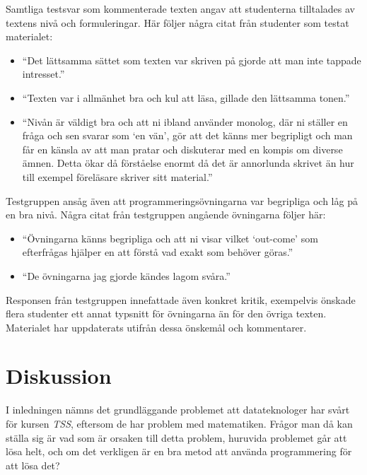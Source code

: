 \documentclass[12pt,a4paper,twoside,openright]{article}
\begin{document}
Samtliga testsvar som kommenterade texten angav att studenterna
tilltalades av textens nivå och formuleringar. Här följer några citat
från studenter som testat materialet:
\begin{itemize}
\item ``Det lättsamma sättet som texten var skriven på gjorde att man
 inte tappade intresset.''
\item ``Texten var i allmänhet bra och kul att läsa, gillade den
 lättsamma tonen.''
\item ``Nivån är väldigt bra och att ni ibland använder monolog, där
 ni ställer en fråga och sen svarar som `en vän', gör att det känns
 mer begripligt och man får en känsla av att man pratar och
 diskuterar med en kompis om diverse ämnen. Detta ökar då förståelse
 enormt då det är annorlunda skrivet än hur till exempel föreläsare
 skriver sitt material.''
\end{itemize}

Testgruppen ansåg även att programmeringsövningarna var begripliga och
låg på en bra nivå. Några citat från testgruppen angående övningarna
följer här:
\begin{itemize}
\item ``Övningarna känns begripliga och att ni visar vilket `out-come'
 som efterfrågas hjälper en att förstå vad exakt som behöver göras.''
\item ``De övningarna jag gjorde kändes lagom svåra.''
\end{itemize}

Responsen från testgruppen innefattade även konkret kritik, exempelvis
önskade flera studenter ett annat typsnitt för övningarna än för den
övriga texten. Materialet har uppdaterats utifrån dessa önskemål och
kommentarer.

\section{Diskussion}




I inledningen nämns det grundläggande problemet att datateknologer har
svårt för kursen \textit{TSS}, eftersom de har problem med
matematiken. Frågor man då kan ställa sig är vad som är orsaken till
detta problem, huruvida problemet går att lösa helt, och om det
verkligen är en bra metod att använda programmering för att lösa det?
\end{document}
